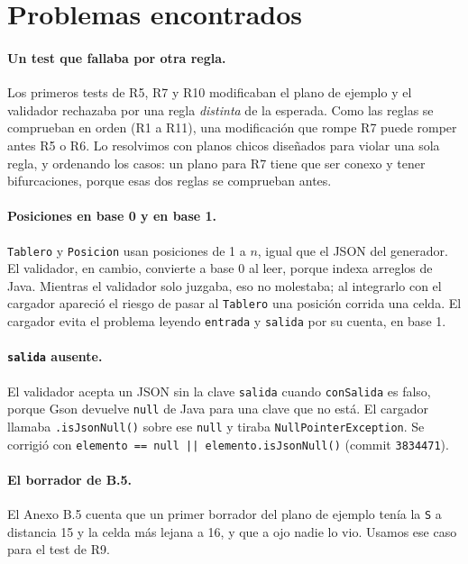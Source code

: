 \documentclass[11pt,a4paper]{article}
\begin{document}
\section{Problemas encontrados}

\paragraph{Un test que fallaba por otra regla.} Los primeros tests de R5, R7 y
R10 modificaban el plano de ejemplo y el validador rechazaba por una regla
\emph{distinta} de la esperada. Como las reglas se comprueban en orden
(R1 a R11), una modificaci\'on que rompe R7 puede romper antes R5 o R6. Lo
resolvimos con planos chicos dise\~nados para violar una sola regla, y
ordenando los casos: un plano para R7 tiene que ser conexo y tener
bifurcaciones, porque esas dos reglas se comprueban antes.

\paragraph{Posiciones en base 0 y en base 1.} \texttt{Tablero} y \texttt{Posicion}
usan posiciones de 1 a $n$, igual que el JSON del generador. El validador, en
cambio, convierte a base 0 al leer, porque indexa arreglos de Java. Mientras
el validador solo juzgaba, eso no molestaba; al integrarlo con el cargador
apareci\'o el riesgo de pasar al \texttt{Tablero} una posici\'on corrida una
celda. El cargador evita el problema leyendo \texttt{entrada} y \texttt{salida}
por su cuenta, en base 1.

\paragraph{\texttt{salida} ausente.} El validador acepta un JSON sin la clave
\texttt{salida} cuando \texttt{conSalida} es falso, porque Gson devuelve
\texttt{null} de Java para una clave que no est\'a. El cargador llamaba
\texttt{.isJsonNull()} sobre ese \texttt{null} y tiraba
\texttt{NullPointerException}. Se corrigi\'o con
\texttt{elemento == null || elemento.isJsonNull()} (commit \texttt{3834471}).

\paragraph{El borrador de B.5.} El Anexo B.5 cuenta que un primer borrador del
plano de ejemplo ten\'ia la \texttt{S} a distancia 15 y la celda m\'as lejana a 16,
y que a ojo nadie lo vio. Usamos ese caso para el test de R9.
\end{document}
